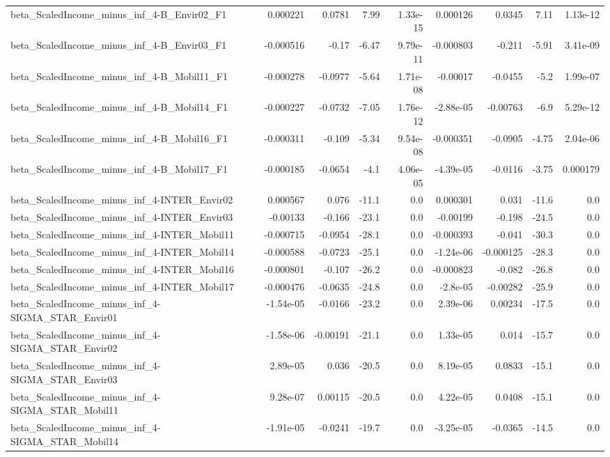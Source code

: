 \begin{tabular}{lrrrrrrrr}
beta_ScaledIncome_minus_inf_4-B_Envir02_F1 & 0.000221 & 0.0781 & 7.99 & 1.33e-15 & 0.000126 & 0.0345 & 7.11 & 1.13e-12 \\
beta_ScaledIncome_minus_inf_4-B_Envir03_F1 & -0.000516 & -0.17 & -6.47 & 9.79e-11 & -0.000803 & -0.211 & -5.91 & 3.41e-09 \\
beta_ScaledIncome_minus_inf_4-B_Mobil11_F1 & -0.000278 & -0.0977 & -5.64 & 1.71e-08 & -0.00017 & -0.0455 & -5.2 & 1.99e-07 \\
beta_ScaledIncome_minus_inf_4-B_Mobil14_F1 & -0.000227 & -0.0732 & -7.05 & 1.76e-12 & -2.88e-05 & -0.00763 & -6.9 & 5.29e-12 \\
beta_ScaledIncome_minus_inf_4-B_Mobil16_F1 & -0.000311 & -0.109 & -5.34 & 9.54e-08 & -0.000351 & -0.0905 & -4.75 & 2.04e-06 \\
beta_ScaledIncome_minus_inf_4-B_Mobil17_F1 & -0.000185 & -0.0654 & -4.1 & 4.06e-05 & -4.39e-05 & -0.0116 & -3.75 & 0.000179 \\
beta_ScaledIncome_minus_inf_4-INTER_Envir02 & 0.000567 & 0.076 & -11.1 & 0.0 & 0.000301 & 0.031 & -11.6 & 0.0 \\
beta_ScaledIncome_minus_inf_4-INTER_Envir03 & -0.00133 & -0.166 & -23.1 & 0.0 & -0.00199 & -0.198 & -24.5 & 0.0 \\
beta_ScaledIncome_minus_inf_4-INTER_Mobil11 & -0.000715 & -0.0954 & -28.1 & 0.0 & -0.000393 & -0.041 & -30.3 & 0.0 \\
beta_ScaledIncome_minus_inf_4-INTER_Mobil14 & -0.000588 & -0.0723 & -25.1 & 0.0 & -1.24e-06 & -0.000125 & -28.3 & 0.0 \\
beta_ScaledIncome_minus_inf_4-INTER_Mobil16 & -0.000801 & -0.107 & -26.2 & 0.0 & -0.000823 & -0.082 & -26.8 & 0.0 \\
beta_ScaledIncome_minus_inf_4-INTER_Mobil17 & -0.000476 & -0.0635 & -24.8 & 0.0 & -2.8e-05 & -0.00282 & -25.9 & 0.0 \\
beta_ScaledIncome_minus_inf_4-SIGMA_STAR_Envir01 & -1.54e-05 & -0.0166 & -23.2 & 0.0 & 2.39e-06 & 0.00234 & -17.5 & 0.0 \\
beta_ScaledIncome_minus_inf_4-SIGMA_STAR_Envir02 & -1.58e-06 & -0.00191 & -21.1 & 0.0 & 1.33e-05 & 0.014 & -15.7 & 0.0 \\
beta_ScaledIncome_minus_inf_4-SIGMA_STAR_Envir03 & 2.89e-05 & 0.036 & -20.5 & 0.0 & 8.19e-05 & 0.0833 & -15.1 & 0.0 \\
beta_ScaledIncome_minus_inf_4-SIGMA_STAR_Mobil11 & 9.28e-07 & 0.00115 & -20.5 & 0.0 & 4.22e-05 & 0.0408 & -15.1 & 0.0 \\
beta_ScaledIncome_minus_inf_4-SIGMA_STAR_Mobil14 & -1.91e-05 & -0.0241 & -19.7 & 0.0 & -3.25e-05 & -0.0365 & -14.5 & 0.0 \\

\end{tabular}
